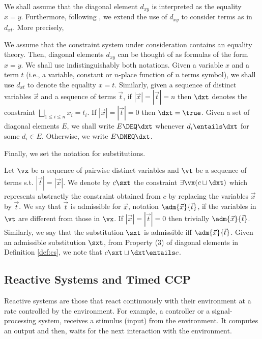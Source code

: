 \documentclass{tlp}
\begin{document}
We shall assume that 
the diagonal element $d_{xy}$
is  interpreted as the equality $x=y$. Furthermore, 
following \cite{DBLP:journals/jlp/GiacobazziDL95}, we extend the use of $d_{xy}$ to consider terms as in $d_{xt}$. More precisely,


\begin{convention}\label{conv:diag}
We assume that the constraint system under consideration contains an
equality theory. Then, diagonal elements $d_{xy}$ can be 
thought of as formulas of the form $x=y$.  
We shall use indistinguishably both notations.  Given a variable $x$ and
a term $t$ (i.e., a variable, constant or $n$-place function of $n$ terms symbol), we shall use $d_{xt}$ to denote the equality $x=t$.
Similarly, given a sequence of distinct variables $\vec{x}$ and a sequence of terms  $\vec{t}$, if $|\vec{x}|=|\vec{t}|=n$ then   $\dxt $  
denotes the constraint $\bigsqcup\limits_{1\leq i \leq n} x_i = t_i$.
If $|\vec{x}|=|\vec{t}|=0$ then $\dxt  = \true$. Given a set of diagonal elements  $E$, we shall write $E\DEQ \dxt$ whenever $d_i \entails  \dxt$ for some $d_i \in E$. Otherwise, we write $E \DNEQ \dxt$.
\end{convention}
 
Finally,  we set the notation for substitutions.


\begin{notation} \label{not:terms}
Let $\vx$ be a sequence of pairwise distinct variables and $\vt$ be a sequence of terms s.t. $|\vec{t}|=|\vec{x}|$. 
We denote by  $c\sxt $ the constraint $\exists \vx(c \sqcup \dxt )$
which represents abstractly the constraint obtained from $c$ by
replacing the variables $\vec{x}$ by $\vec{t}$.
We say that $\vec{t}$ is admissible for $\vec{x}$, notation
$\adm{\vec{x}}{\vec{t}}$, if the variables in $\vt$ are different from those in $\vx$. 
If $|\vec{x}| =|\vec{t}| =0$ then trivially
$\adm{\vec{x}}{\vec{t}}$.
Similarly, we say that the substitution $\sxt $ is admissible iff
$\adm{\vec{x}}{\vec{t}}$. 
Given an admissible
substitution $\sxt $, from   Property (3) of diagonal elements in Definition \ref{def:cs},  we note that   $c\sxt  \sqcup \dxt  \entails c$. 
\end{notation}



\subsection{Reactive Systems and  Timed CCP}
\label{sec:tcc-definition}
Reactive systems \cite{BeGo92} are those that react continuously with
their environment at a  rate controlled by the environment. 
For example, a controller or a  signal-processing system, receives a
stimulus (input) from the environment. It computes an output  and
then, waits for the next interaction with the environment. 
\end{document}
